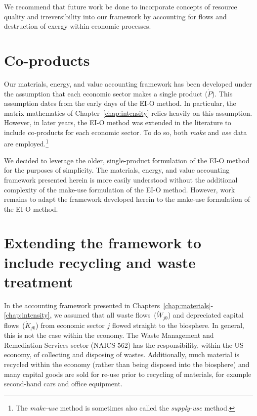 \vspace{5 mm}

We recommend that future work be done to incorporate 
concepts of resource quality and irreversibility 
into our framework by accounting for flows and
destruction of exergy within economic processes.


\section{Co-products}
\label{sec:make-use}

Our materials, energy, and value accounting framework 
has been developed under the assumption 
that each economic sector makes a single product ($\dot{P}$).
This assumption dates from the early days of the EI-O method.\cite{Bullard-III:1975aa}
In particular, the matrix mathematics of Chapter~\ref{chap:intensity}
relies heavily on this assumption. 
However, in later years, the EI-O method was extended 
in the literature to include
co-products for each economic sector.\cite{Costanza:1984tq,Casler1984} 
To do so, both \emph{make} and \emph{use} data are employed.\footnote{The
	\emph{make-use} method is sometimes also called the
	\emph{supply-use} method.
	}

We decided to leverage the older,
single-product formulation of the EI-O method
for the purposes of simplicity. 
The materials, energy, and value accounting framework
presented herein is more easily understood 
without the additional complexity of the make-use formulation 
of the EI-O method.
However, work remains to adapt the framework
developed herein to the make-use formulation of the EI-O method.

\section{Extending the framework to include recycling and waste treatment}
\label{sec:recycling_and_waste}

In the accounting framework presented in Chapters~\ref{chap:materials}-\ref{chap:intensity},
we assumed that all waste flows~($\dot{W}_{j0}$) and depreciated capital flows~($\dot{K}_{j0}$)
from economic sector $j$ flowed straight to the biosphere.
In general, this is not the case within the economy.
The Waste Management and Remediation Services sector (NAICS 562) has the responsibility,
within the US economy,
of collecting and disposing of wastes.
Additionally, much material is recycled within the economy 
(rather than being disposed into the biosphere)
and many capital goods are sold for re-use prior to recycling of materials,
for example second-hand cars and office equipment.

